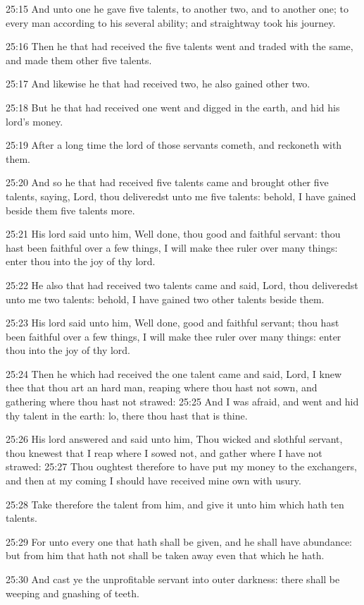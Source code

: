 25:15 And unto one he gave five talents, to another two, and to another one; to every man according to his several ability; and straightway took his journey.

25:16 Then he that had received the five talents went and traded with the same, and made them other five talents.

25:17 And likewise he that had received two, he also gained other two.

25:18 But he that had received one went and digged in the earth, and hid his lord's money.

25:19 After a long time the lord of those servants cometh, and reckoneth with them.

25:20 And so he that had received five talents came and brought other five talents, saying, Lord, thou deliveredst unto me five talents: behold, I have gained beside them five talents more.

25:21 His lord said unto him, Well done, thou good and faithful servant: thou hast been faithful over a few things, I will make thee ruler over many things: enter thou into the joy of thy lord.

25:22 He also that had received two talents came and said, Lord, thou deliveredst unto me two talents: behold, I have gained two other talents beside them.

25:23 His lord said unto him, Well done, good and faithful servant; thou hast been faithful over a few things, I will make thee ruler over many things: enter thou into the joy of thy lord.

25:24 Then he which had received the one talent came and said, Lord, I knew thee that thou art an hard man, reaping where thou hast not sown, and gathering where thou hast not strawed: 25:25 And I was afraid, and went and hid thy talent in the earth: lo, there thou hast that is thine.

25:26 His lord answered and said unto him, Thou wicked and slothful servant, thou knewest that I reap where I sowed not, and gather where I have not strawed: 25:27 Thou oughtest therefore to have put my money to the exchangers, and then at my coming I should have received mine own with usury.

25:28 Take therefore the talent from him, and give it unto him which hath ten talents.

25:29 For unto every one that hath shall be given, and he shall have abundance: but from him that hath not shall be taken away even that which he hath.

25:30 And cast ye the unprofitable servant into outer darkness: there shall be weeping and gnashing of teeth.

